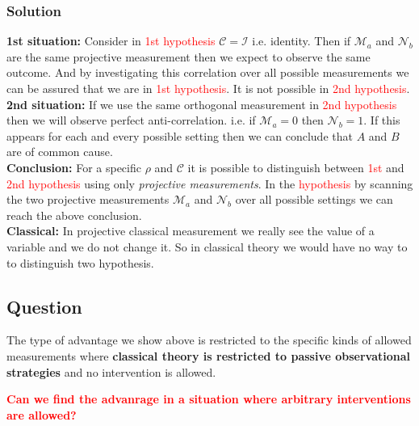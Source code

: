 \documentclass[a4paper,11pt]{article}
\begin{document}
\subsubsection{Solution}
\textbf{1st situation:} Consider in \textcolor{red}{1st hypothesis} $\mathcal{C}=\mathcal{I}$ i.e. identity. Then if $\mathcal{M}_a$ and $\mathcal{N}_b$ are the same projective measurement then we expect to observe the same outcome. And by investigating this correlation over all possible measurements we can be assured that we are in \textcolor{red}{1st hypothesis}. It is not possible in \textcolor{red}{2nd hypothesis}.
\\

\noindent\textbf{2nd situation:} If we use the same orthogonal measurement in \textcolor{red}{2nd hypothesis} then we will observe perfect anti-correlation. i.e. if $\mathcal{M}_a=0$ then $\mathcal{N}_b=1$. If this appears for each and every possible setting then we can conclude that $A$ and $B$ are of common cause.
\\

\noindent \textbf{Conclusion:} For a specific $\rho$ and $\mathcal{C}$ it is possible to distinguish between \textcolor{red}{1st} and \textcolor{red}{2nd hypothesis} using only \textit{projective measurements}.
In the \textcolor{red}{hypothesis} by scanning the two projective measurements $\mathcal{M}_a$ and $\mathcal{N}_b$ over all possible settings we can reach the above conclusion.
\\

\noindent\textbf{Classical:} In projective classical measurement we really see the value of a variable and we do not change it. So in classical theory we would have no way to to distinguish two hypothesis.

\subsection{Question}
The type of advantage we show above is restricted to the specific kinds of allowed measurements where \textbf{classical theory is restricted to passive observational strategies} and no intervention is allowed.

\noindent\textbf{\textcolor{red}{Can we find the advanrage in a situation where arbitrary interventions are allowed?}}
\end{document}
